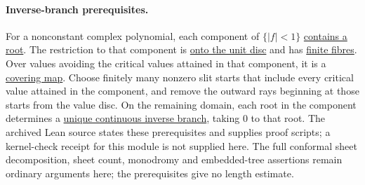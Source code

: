 \paragraph{Inverse-branch prerequisites.}
\label{res:component-local-covering-long}
For a nonconstant complex polynomial, each component of $\{|f|<1\}$
\href{https://github.com/wcook04/plectis-erdos/blob/e98130bfe66aa33606e116791080b3ed13e1d68a/evidence/source-prerequisites/8bf96bdcae6b9201c670fff3037c49c70ec6de8d/lean/ErdosProblems/Erdos1041/OutwardSlitDomain.lean\#L349}{contains a root}.
The restriction to that component is
\href{https://github.com/wcook04/plectis-erdos/blob/e98130bfe66aa33606e116791080b3ed13e1d68a/evidence/source-prerequisites/8bf96bdcae6b9201c670fff3037c49c70ec6de8d/lean/ErdosProblems/Erdos1041/OutwardSlitDomain.lean\#L211}{onto the unit disc} and has
\href{https://github.com/wcook04/plectis-erdos/blob/e98130bfe66aa33606e116791080b3ed13e1d68a/evidence/source-prerequisites/8bf96bdcae6b9201c670fff3037c49c70ec6de8d/lean/ErdosProblems/Erdos1041/OutwardSlitDomain.lean\#L233}{finite fibres}.
Over values avoiding the critical values attained in that component,
it is a \href{https://github.com/wcook04/plectis-erdos/blob/e98130bfe66aa33606e116791080b3ed13e1d68a/evidence/source-prerequisites/8bf96bdcae6b9201c670fff3037c49c70ec6de8d/lean/ErdosProblems/Erdos1041/OutwardSlitDomain.lean\#L250}{covering map}.
Choose finitely many nonzero slit starts that include every critical
value attained in the component, and remove the outward rays beginning
at those starts from the value disc. On the remaining domain, each root
in the component determines a
\href{https://github.com/wcook04/plectis-erdos/blob/e98130bfe66aa33606e116791080b3ed13e1d68a/evidence/source-prerequisites/8bf96bdcae6b9201c670fff3037c49c70ec6de8d/lean/ErdosProblems/Erdos1041/OutwardSlitDomain.lean\#L359}{unique continuous inverse branch}, taking $0$ to that root.
The archived Lean source states these prerequisites and supplies proof
scripts; a kernel-check receipt for this module is not supplied here.
The full conformal
sheet decomposition, sheet count, monodromy and embedded-tree assertions
remain ordinary arguments here; the prerequisites give no
length estimate.





